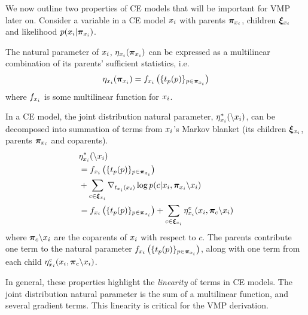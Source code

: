We now outline two properties of CE models
that will be important for VMP later on.
Consider a variable in a CE model $x_i$ with
parents $\bm{\pi}_{x_i}$, children $\bm{\xi}_{x_i}$
and likelihood $p(x_i | \bm{\pi}_{x_i})$.
\begin{property}
\label{prop:multilinear}
The natural parameter of $x_i$, $\eta_{x_i}(\bm{\pi}_{x_i})$
can be expressed as a multilinear combination
of its parents' sufficient statistics, i.e.
\begin{equation}
    \eta_{x_i}(\bm{\pi}_{x_i}) = f_{x_i}\left(\{t_p(p)\}_{p \in \bm{\pi}_{x_i}}\right)
\end{equation}
where $f_{x_i}$ is some multilinear function for $x_i$.
\end{property}



\begin{property}
\label{prop:jointparam}
In a CE model,
the joint distribution natural parameter, $\eta^*_{x_i}(\backslash x_i)$,
can be decomposed into summation of terms from $x_i$'s Markov blanket
(its children $\bm{\xi}_{x_i}$, parents $\bm{\pi}_{x_i}$ and coparents).
\begin{equation}
\begin{split}
    &\eta^*_{x_i}(\backslash x_i) \\
    &= f_{x_i}\left(\{t_p(p)\}_{p \in \bm{\pi}_{x_i}}\right)\\
    &+ \sum_{c \in \bm{\xi}_{x_i}} \nabla_{t_{x_i}(x_i)}\log p(c | x_i, \bm{\pi}_{x_i} \backslash x_i)\\
    &= f_{x_i}\left(\{t_p(p)\}_{p \in \bm{\pi}_{x_i}}\right)
    + \sum_{c \in \bm{\xi}_{x_i}} \eta^c_{x_i}(x_i, \bm{\pi}_c \backslash x_i)
\end{split}
\end{equation}
where $\bm{\pi}_c \backslash x_i$ are the coparents of $x_i$ with respect to $c$.
The parents contribute one term to the natural parameter $f_{x_i}\left(\{t_p(p)\}_{p \in \bm{\pi}_{x_i}}\right)$, along with one
term from each child $\eta^c_{x_i}(x_i, \bm{\pi}_c \backslash x_i)$.

\end{property}
In general, these properties highlight the \emph{linearity} of terms
in CE models. The joint distribution natural parameter
is the sum of a multilinear function,
and several gradient terms.
This linearity is critical for the VMP derivation.


